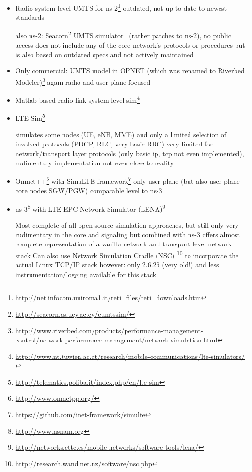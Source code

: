 \begin{itemize}

	\item Radio system level UMTS for ns-2\footnote{\url{http://net.infocom.uniroma1.it/reti_files/reti_downloads.htm}}
	outdated, not up-to-date to newest standards

	also ns-2: 
	Seacorn\footnote{\url{http://seacorn.cs.ucy.ac.cy/eumtssim/}} UMTS simulator~\cite{vranjevs2011use} (rather patches to ns-2), no public access
	does not include any of the core network's protocols or procedures
	but is also based on outdated specs and not actively maintained

	\item Only commercial: UMTS model in OPNET (which was renamed to Riverbed Modeler)\footnote{\url{http://www.riverbed.com/products/performance-management-control/network-performance-management/network-simulation.html}} 
	again radio and user plane focused

	\item Matlab-based radio link system-level sim\footnote{\url{http://www.nt.tuwien.ac.at/research/mobile-communications/lte-simulators/}}~\cite{mehlfuhrer2011vienna}

	\item LTE-Sim\footnote{\url{http://telematics.poliba.it/index.php/en/lte-sim}}~\cite{5634134}
	
	simulates some nodes (UE, eNB, MME) and only a limited selection of involved protocols (PDCP, RLC, very basic RRC)
	very limited for network/transport layer protocols (only basic ip, tcp not even implemented), rudimentary implementation not even close to reality

	\item Omnet++\footnote{\url{http://www.omnetpp.org/}}
	with SimuLTE framework\footnote{\url{https://github.com/inet-framework/simulte}}
	only user plane (but also user plane core nodes SGW/PGW)
	comparable level to ns-3

	\item ns-3\footnote{\url{http://www.nsnam.org}} with \gls{LTE}-\gls{EPC} Network Simulator (LENA)\footnote{\url{http://networks.cttc.es/mobile-networks/software-tools/lena/}}~\cite{Baldo:2013:OSM:2507924.2507940} 

	Most complete of all open source simulation approaches, but still only very rudimentary in the core and signaling
	but combined with ns-3 offers almost complete representation of a vanilla network and transport level network stack
	Can also use Network Simulation Cradle (NSC) \footnote{\url{http://research.wand.net.nz/software/nsc.php}} to incorporate the actual Linux TCP/IP stack
	however: only 2.6.26 (very old!) and less instrumentation/logging available for this stack



\end{itemize}


